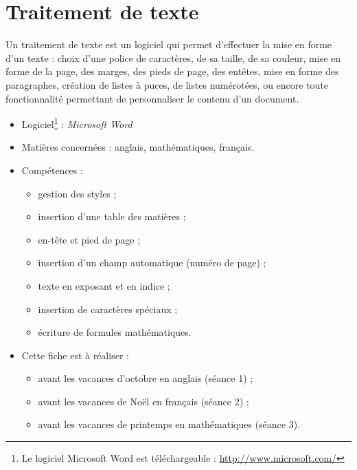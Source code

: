 \chapter{Traitement de texte}  

Un traitement de texte est un logiciel qui permet d'effectuer la mise en forme d'un texte : choix d'une police de caractères, de sa taille, de sa couleur, mise en forme de la page, des marges, des pieds de page, des entêtes, mise en forme des paragraphes, création de listes à puces, de listes numérotées, ou encore toute fonctionnalité permettant de personnaliser le contenu d'un document.\\

{\footnotesize
\begin{itemize}
\item Logiciel\footnote{Le logiciel Microsoft Word est téléchargeable : \url{http://www.microsoft.com/}} : \emph{Microsoft Word} 
\item Matières concernées : anglais, mathématiques, français.
\item Compétences : 
        \begin{itemize}
        \item gestion des styles ;
	\item insertion d'une table des matières ;
	\item en-tête et pied de page ;
	\item insertion d'un champ automatique (numéro de page) ;
	\item texte en exposant et en indice ;
	\item insertion de caractères spéciaux ; 
	\item écriture de formules mathématiques.
        \end{itemize}
\item Cette fiche est à réaliser :
        \begin{itemize}
        \item avant les vacances d'octobre en anglais (séance 1) ;
	\item avant les vacances de Noël en français (séance 2) ;
        \item avant les vacances de printemps en mathématiques (séance 3).     
        \end{itemize}
\end{itemize}
}%


\phantom{rien}


